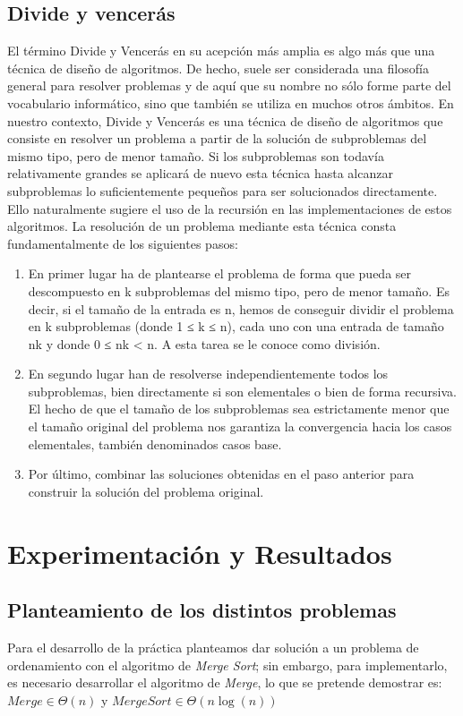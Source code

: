 \documentclass[12pt,twoside]{article}
\begin{document}
\subsection{\textbf{Divide y vencerás}}
\setlength{\parindent}{1.5em}El término Divide y Vencerás en su acepción más amplia es algo más que una técnica de diseño de algoritmos. De hecho, suele ser considerada una filosofía general para resolver problemas y de aquí que su nombre no sólo forme parte del vocabulario informático, sino que también se utiliza en muchos otros ámbitos.
En nuestro contexto, Divide y Vencerás es una técnica de diseño de algoritmos que consiste en resolver un problema a partir de la solución de subproblemas del mismo tipo, pero de menor tamaño. Si los subproblemas son todavía relativamente grandes se aplicará de nuevo esta técnica hasta alcanzar subproblemas lo suficientemente pequeños para ser solucionados directamente. Ello naturalmente sugiere el uso de la recursión en las implementaciones de estos algoritmos.
La resolución de un problema mediante esta técnica consta fundamentalmente de los siguientes pasos:
\begin{enumerate}
  \item En primer lugar ha de plantearse el problema de forma que pueda ser descompuesto en k subproblemas del mismo tipo, pero de menor tamaño. Es decir, si el tamaño de la entrada es n, hemos de conseguir dividir el problema en k subproblemas (donde 1 ≤ k ≤ n), cada uno con una entrada de tamaño nk y donde 0 ≤ nk < n. A esta tarea se le conoce como división.
  \item En segundo lugar han de resolverse independientemente todos los subproblemas, bien directamente si son elementales o bien de forma recursiva. El hecho de que el tamaño de los subproblemas sea estrictamente menor que el tamaño original del problema nos garantiza la convergencia hacia los casos elementales, también denominados casos base.
  \item Por último, combinar las soluciones obtenidas en el paso anterior para construir la solución del problema original.
\end{enumerate}
\centerline{}


\section{Experimentaci\'on y Resultados}
\subsection{\textbf{Planteamiento de los distintos problemas}}
Para el desarrollo de la práctica planteamos dar solución a un problema de ordenamiento con el algoritmo de \textit{Merge Sort}; sin embargo, para implementarlo, es necesario
desarrollar el algoritmo de \textit{Merge}, lo que se pretende demostrar es:
$Merge \in \Theta (n)$ y $Merge Sort \in \Theta (n \log (n))$
\centerline{}
\end{document}
